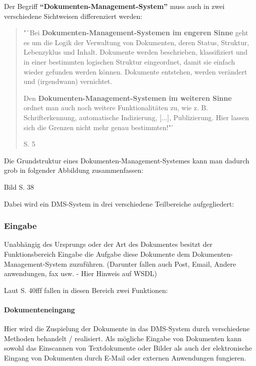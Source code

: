 Der Begriff \textbf{"`Dokumenten-Management-System"'} muss auch in zwei verschiedene Sichtweisen differenziert werden:
\begin{quote}"`Bei \textbf{Dokumenten-Management-Systemen im engeren Sinne} geht es um die Logik der Verwaltung von Dokumenten, deren Status, Struktur, Lebenzyklus und Inhalt. Dokumente werden beschrieben, klassifiziert und in einer bestimmten logischen Struktur eingeordnet, damit sie einfach wieder gefunden werden können. Dokumente entstehen, werden verändert und (irgendwann) vernichtet.

Den \textbf{Dokumenten-Management-Systemen im weiteren Sinne} ordnet man auch noch weitere Funktionalitäten zu, wie z. B. Schrifterkennung, automatische Indizierung, [...], Publizierung. Hier lassen sich die Grenzen nicht mehr genau bestimmten!"' \begin{flushright}\cite{DMS08} S. 5\end{flushright}\end{quote}

Die Grundstruktur eines Dokumenten-Management-Systemes kann man dadurch grob in folgender Abbildung zusammenfassen:

\begin{center}
Bild \cite{DMS08} S. 38
\end{center}

Dabei wird ein DMS-System in drei verschiedene Teilbereiche aufgegliedert:

\subsubsection{Eingabe}
Unabhängig des Ursprungs oder der Art des Dokumentes besitzt der Funktionsbereich Eingabe die Aufgabe diese Dokumente dem Dokumenten-Management-System zuzuführen.
(Darunter fallen auch Post, Email, Andere anwendungen, fax usw. - Hier Hinweis auf WSDL)

Laut \cite{DMS08} S. 40fff fallen in diesen Bereich zwei Funktionen:

\paragraph{Dokumenteneingang}
Hier wird die Zuspielung der Dokumente in das DMS-System durch verschiedene Methoden behandelt / realisiert.
Als mögliche Eingabe von Dokumenten kann sowohl das Einscannen von Textdokumente oder Bilder als auch der elektronische Eingang von Dokumenten durch E-Mail oder externen Anwendungen fungieren.


